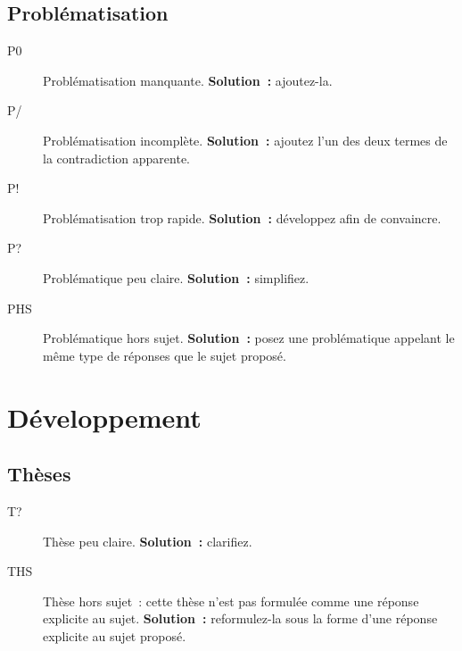 \documentclass[a4paper,11pt]{article}
\begin{document}
\subsection{Problématisation}
\label{sec:orgb37b352}
\begin{description}
\item[{P0}] Problématisation manquante. \textbf{Solution :} ajoutez-la.
\item[{P/}] Problématisation incomplète. \textbf{Solution :} ajoutez l'un des deux
termes de la contradiction apparente.
\item[{P\string!}] Problématisation trop rapide. \textbf{Solution :} développez afin de
convaincre.
\item[{P\string?}] Problématique peu claire. \textbf{Solution :} simplifiez.
\item[{PHS}] Problématique hors sujet. \textbf{Solution :} posez une problématique
appelant le même type de réponses que le sujet proposé.
\end{description}

\section{Développement}
\label{sec:orga38070c}

\subsection{Thèses}
\label{sec:org2ce5631}
\begin{description}
\item[{T\string?}] Thèse peu claire. \textbf{Solution :} clarifiez.
\item[{THS}] Thèse hors sujet : cette thèse n'est pas formulée comme une
réponse explicite au sujet. \textbf{Solution :} reformulez-la sous la forme
d'une réponse explicite au sujet proposé.
\end{description}
\end{document}
